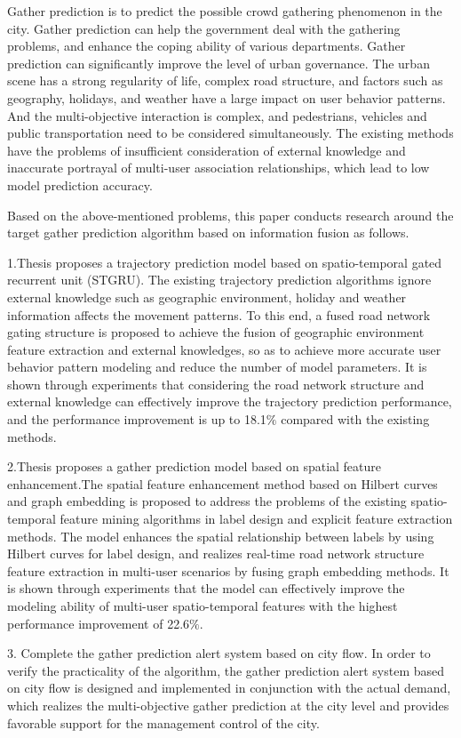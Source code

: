 \documentclass[master]{thesis-uestc}
\begin{document}
\begin{englishabstract}
Gather prediction is to predict the possible crowd gathering phenomenon in the city. Gather prediction can help the government deal with the gathering problems, and enhance the coping ability of various departments. Gather prediction can significantly improve the level of urban governance. The urban scene has a strong regularity of life, complex road structure, and factors such as geography, holidays, and weather have a large impact on user behavior patterns. And the multi-objective interaction is complex, and pedestrians, vehicles and public transportation need to be considered simultaneously. The existing methods have the problems of insufficient consideration of external knowledge and inaccurate portrayal of multi-user association relationships, which lead to low model prediction accuracy.

Based on the above-mentioned problems, this paper conducts research around the target gather prediction algorithm based on information fusion as follows.

1.Thesis proposes a trajectory prediction model based on spatio-temporal gated recurrent unit (STGRU). The existing trajectory prediction algorithms ignore external knowledge such as geographic environment, holiday and weather information affects the movement patterns. To this end, a fused road network gating structure is proposed to achieve the fusion of geographic environment feature extraction and external knowledges, so as to achieve more accurate user behavior pattern modeling and reduce the number of model parameters. It is shown through experiments that considering the road network structure and external knowledge can effectively improve the trajectory prediction performance, and the performance improvement is up to 18.1$\%$ compared with the existing methods.

2.Thesis proposes a gather prediction model based on spatial feature enhancement.The spatial feature enhancement method based on Hilbert curves and graph embedding is proposed to address the problems of the existing spatio-temporal feature mining algorithms in label design and explicit feature extraction methods. The model enhances the spatial relationship between labels by using Hilbert curves for label design, and realizes real-time road network structure feature extraction in multi-user scenarios by fusing graph embedding methods. It is shown through experiments that the model can effectively improve the modeling ability of multi-user spatio-temporal features with the highest performance improvement of 22.6$\%$.

3. Complete the gather prediction alert system based on city flow. In order to verify the practicality of the algorithm, the gather prediction alert system based on city flow is designed and implemented in conjunction with the actual demand, which realizes the multi-objective gather prediction at the city level and provides favorable support for the management control of the city.

\end{englishabstract}
\end{document}

